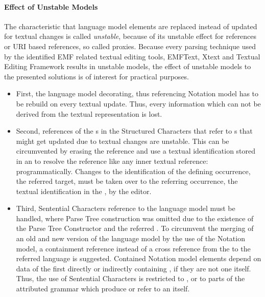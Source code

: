 \paragraph{Effect of Unstable Models}
The characteristic that language model elements are replaced instead of updated for textual changes is called \emph{unstable}, because of its unstable effect for references or URI based references, so called proxies. Because every parsing technique used by the identified EMF related textual editing tools, EMFText, Xtext and Textual Editing Framework results in unstable models, the effect of unstable models to the presented solutions is of interest for practical purposes. 
\begin{itemize}
	\item First, the language model decorating, thus referencing Notation model has to be rebuild on every textual update. Thus, every information which can not be derived from the textual representation is lost.
	\item  Second, references of the s in the Structured Characters that refer to s that might get updated due to textual changes are unstable. This can be circumvented by erasing the reference and use a textual identification stored in an  to resolve the reference like any inner textual reference: programmatically. Changes to the identification of the defining occurrence, the referred target, must be taken over to the referring occurrence, the textual identification in the , by the editor.
	\item Third, Sentential Characters reference to the language model must be handled, where Parse Tree construction was omitted due to the existence of the Parse Tree Constructor and the referred . To circumvent the merging of an old and new version of the language model by the use of the Notation model, a containment reference instead of a cross reference from the  to the referred language  is suggested. Contained Notation model elements depend on data of the first directly or indirectly containing , if they are not one itself. Thus, the use of Sentential Characters is restricted to , or to parts of the attributed grammar which produce or refer to an  itself. 
\end{itemize}

